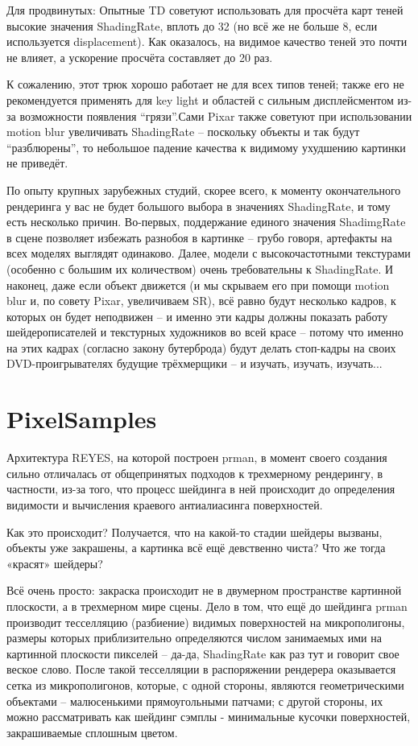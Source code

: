  Для
    продвинутых: Опытные TD советуют
    использовать для просчёта карт теней высокие значения ShadingRate,
    вплоть до 32 (но всё же не больше 8, если используется
    displacement). Как оказалось, на видимое качество теней это почти
    не влияет, а ускорение просчёта составляет до 20
    раз.
  

 К сожалению,
    этот трюк хорошо работает не для всех типов теней; также его не
    рекомендуется применять для key light и областей с сильным
    дисплейсментом из-за возможности появления “грязи”.Сами Pixar также
    советуют при использовании motion blur увеличивать ShadingRate –
    поскольку объекты и так будут “разблюрены”, то небольшое падение
    качества к видимому ухудшению картинки не приведёт.
  

 По опыту
    крупных зарубежных студий, скорее всего, к моменту окончательного
    рендеринга у вас не будет большого выбора в значениях ShadingRate,
    и тому есть несколько причин. Во-первых, поддержание единого
    значения ShadimgRate в сцене позволяет избежать разнобоя в картинке
    – грубо говоря, артефакты на всех моделях выглядят одинаково.
    Далее, модели с высокочастотными текстурами (особенно с большим их
    количеством) очень требовательны к ShadingRate. И наконец, даже
    если объект движется (и мы скрываем его при помощи motion blur и,
    по совету Pixar, увеличиваем SR), всё равно будут несколько кадров,
    к которых он будет неподвижен – и именно эти кадры должны показать
    работу шейдерописателей  и текстурных художников во всей красе
    – потому что именно на этих кадрах (согласно закону бутерброда)
    будут делать стоп-кадры на своих DVD-проигрывателях
    будущие трёхмерщики – и изучать, изучать, изучать...
 
 \section*{PixelSamples}
  

 Архитектура REYES, на которой построен prman, в
    момент своего создания сильно отличалась от общепринятых подходов к
    трехмерному рендерингу, в частности, из-за того, что процесс
    шейдинга в ней происходит до определения видимости и вычисления
    краевого антиалиасинга поверхностей.
  

 Как это происходит? Получается, что на какой-то
    стадии шейдеры вызваны, объекты уже закрашены, а картинка всё ещё
    девственно чиста? Что же тогда «красят» шейдеры?
  

 Всё очень просто: закраска происходит не в
    двумерном пространстве картинной плоскости, а в трехмерном мире
    сцены. Дело в том, что ещё до шейдинга prman производит тесселляцию
    (разбиение) видимых поверхностей на микрополигоны, размеры которых
    приблизительно определяются числом занимаемых ими на картинной
    плоскости пикселей – да-да, ShadingRate как раз тут и говорит свое
    веское слово. После такой тесселляции в распоряжении рендерера
    оказывается сетка из микрополигонов, которые, с одной стороны,
    являются геометрическими объектами – малюсенькими прямоугольными
    патчами; с другой стороны, их можно рассматривать как шейдинг
    сэмплы - минимальные кусочки поверхностей, закрашиваемые сплошным
    цветом.
  


